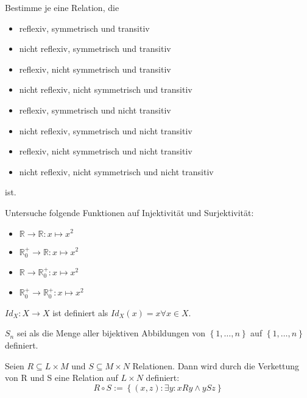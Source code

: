 \documentclass[10pt]{scrbook}
\begin{document}
\begin{Auf}
Bestimme je eine Relation, die
\begin{itemize}
	\item reflexiv, symmetrisch und transitiv
	\item nicht reflexiv, symmetrisch und transitiv
	\item reflexiv, nicht symmetrisch und transitiv
	\item nicht reflexiv, nicht symmetrisch und transitiv
	\item reflexiv, symmetrisch und nicht transitiv
	\item nicht reflexiv, symmetrisch und nicht transitiv
	\item reflexiv, nicht symmetrisch und nicht transitiv
	\item nicht reflexiv, nicht symmetrisch und nicht transitiv
\end{itemize}
ist.
\end{Auf}

\begin{Auf}
Untersuche folgende Funktionen auf Injektivität und Surjektivität:
\begin{itemize}
	\item $\mathbb{R}\rightarrow \mathbb{R}: x\mapsto x^2$
	\item $\mathbb{R}^+_0\rightarrow \mathbb{R}: x\mapsto x^2$
	\item $\mathbb{R}\rightarrow \mathbb{R}^+_0: x\mapsto x^2$
	\item $\mathbb{R}^+_0\rightarrow \mathbb{R}^+_0: x\mapsto x^2$
\end{itemize}
\end{Auf}

\begin{Def}
$Id_X: X\rightarrow X$ ist definiert als $Id_X(x)=x \forall x\in X$.
\end{Def}

\begin{Def}
$S_n$ sei als die Menge aller bijektiven Abbildungen von $\left\{1, \ldots, n\right\}$ auf $\left\{1, \ldots, n\right\}$ definiert.
\end{Def}

\begin{Def}Seien $R\subseteq L\times M$ und $S\subseteq M\times N$ Relationen. Dann wird durch die Verkettung von R und S eine Relation auf $L \times N$ definiert:
\begin{displaymath}
	R\circ S:=\left\{(x, z): \exists y: x R y \wedge y S z\right\}
\end{displaymath}
\end{Def}
\end{document}
